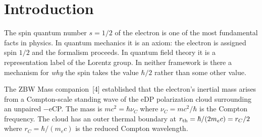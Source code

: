 \documentclass[12pt]{article}
\newcommand{\nuC}{\nu_C}
\newcommand{\rC}{r_C}
\newcommand{\rin}{r_{\rm in}}
\newcommand{\rout}{r_{\rm out}}
\newcommand{\oin}{\omega_{\rm in}}
\newcommand{\oout}{\omega_{\rm out}}
\newcommand{\aBohr}{a_0}
\begin{document}
\begin{abstract}
We derive the electron spin quantum number $s = 1/2$ from first
principles in Conscious Point Physics.  An unpaired $-$eCP moving
through the Dipole Sea captures a Dipole Particle (DP), placing the
inner $+$CP at orbital radius $\rin$ and the outer $-$CP at
$\rout = 2\rin$.  The Coulomb force balance for circular orbits gives
the exact angular frequency ratio:
\begin{equation}
  \frac{\oin}{\oout} \;=\; 2\sqrt{2},
  \label{eq:ratio_abstract}
\end{equation}
derived solely from the $1/r^2$ force law and the standing-wave
boundary condition.  The total orbital angular momentum of the
captured DP is:
\begin{equation}
  L \;=\; m_e\,\oout\,\rin^2\,(2\sqrt{2}+4),
  \label{eq:L_abstract}
\end{equation}
which equals $\hbar/2$ exactly when:
\begin{equation}
  \rin \;=\; \frac{\aBohr}{4(1+\sqrt{2})^2}
  \;=\; \frac{\aBohr}{12+8\sqrt{2}},
  \label{eq:rin_abstract}
\end{equation}
where $\aBohr = \hbar^2/(m_e k_e e^2)$ is the Bohr radius.
This condition is shown to follow from the Coulomb force balance
at the Compton scale.  No free parameters are introduced.
The mechanism extends naturally to all spin-$1/2$ Standard Model
fermions via the same orbital geometry with DP type (eDP or qDP)
appropriate to the particle.  Spin is emergent, not intrinsic.
\end{abstract}

\section{Introduction}
\label{sec:intro}

The spin quantum number $s = 1/2$ of the electron is one of the most
fundamental facts in physics.  In quantum mechanics it is an axiom:
the electron is assigned spin $1/2$ and the formalism proceeds.  In
quantum field theory it is a representation label of the Lorentz group.
In neither framework is there a mechanism for \emph{why} the spin takes
the value $\hbar/2$ rather than some other value.

The ZBW Mass companion~[4] established that the electron's inertial
mass arises from a Compton-scale standing wave of the eDP polarization
cloud surrounding an unpaired $-$eCP.  The mass is $mc^2 = \hbar\nuC$
where $\nuC = mc^2/\hbar$ is the Compton frequency.  The cloud has an
outer thermal boundary at $r_{\rm th} = \hbar/(2m_e c) = \rC/2$ where
$\rC = \hbar/(m_e c)$ is the reduced Compton wavelength.
\end{document}

